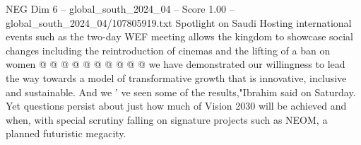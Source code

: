 \begin{textsample}{NEG Dim 6 – global\_south\_2024\_04 – Score 1.00 – global\_south\_2024\_04/107805919.txt}
Spotlight on Saudi Hosting international events such as the two-day WEF meeting allows the kingdom to showcase social changes including the reintroduction of cinemas and the lifting of a ban on women @ @ @ @ @ @ @ @ @ @ we have demonstrated our willingness to lead the way towards a model of transformative growth that is innovative, inclusive and sustainable.
And we ' ve seen some of the results,"Ibrahim said on Saturday.
Yet questions persist about just how much of Vision 2030 will be achieved and when, with special scrutiny falling on signature projects such as NEOM, a planned futuristic megacity.

\end{textsample}
